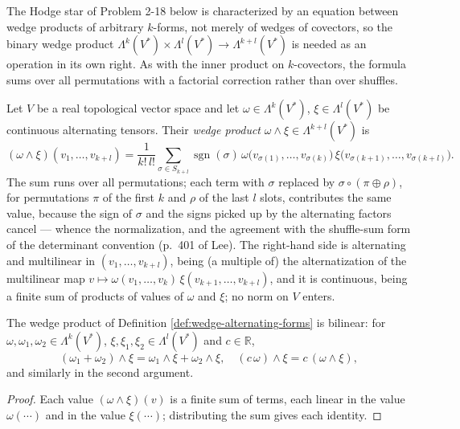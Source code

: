 The Hodge star of Problem 2-18 below is characterized by an equation between wedge products of arbitrary $k$-forms, not merely of wedges of covectors, so the binary wedge product $\Lambda^k(V^*) \times \Lambda^l(V^*) \to \Lambda^{k+l}(V^*)$ is needed as an operation in its own right. As with the inner product on $k$-covectors, the formula sums over all permutations with a factorial correction rather than over shuffles.

\begin{definition}
\label{def:wedge-alternating-forms}
\leanok
Let $V$ be a real topological vector space and let $\omega \in \Lambda^k(V^*)$, $\xi \in \Lambda^l(V^*)$ be continuous alternating tensors. Their \emph{wedge product} $\omega \wedge \xi \in \Lambda^{k+l}(V^*)$ is
\[
(\omega \wedge \xi)(v_1, \ldots, v_{k+l}) = \frac{1}{k!\,l!} \sum_{\sigma \in S_{k+l}} \operatorname{sgn}(\sigma)\, \omega\big(v_{\sigma(1)}, \ldots, v_{\sigma(k)}\big)\, \xi\big(v_{\sigma(k+1)}, \ldots, v_{\sigma(k+l)}\big).
\]
The sum runs over all permutations; each term with $\sigma$ replaced by $\sigma \circ (\pi \oplus \rho)$, for permutations $\pi$ of the first $k$ and $\rho$ of the last $l$ slots, contributes the same value, because the sign of $\sigma$ and the signs picked up by the alternating factors cancel --- whence the normalization, and the agreement with the shuffle-sum form of the determinant convention (p.~401 of Lee). The right-hand side is alternating and multilinear in $(v_1, \ldots, v_{k+l})$, being (a multiple of) the alternatization of the multilinear map $v \mapsto \omega(v_1, \ldots, v_k)\,\xi(v_{k+1}, \ldots, v_{k+l})$, and it is continuous, being a finite sum of products of values of $\omega$ and $\xi$; no norm on $V$ enters.
\end{definition}

\begin{lemma}
\label{lem:wedge-bilinear}
\leanok
{}
The wedge product of Definition \ref{def:wedge-alternating-forms} is bilinear: for $\omega, \omega_1, \omega_2 \in \Lambda^k(V^*)$, $\xi, \xi_1, \xi_2 \in \Lambda^l(V^*)$ and $c \in \mathbb{R}$,
\[
(\omega_1 + \omega_2) \wedge \xi = \omega_1 \wedge \xi + \omega_2 \wedge \xi, \quad (c\,\omega) \wedge \xi = c\,(\omega \wedge \xi),
\]
and similarly in the second argument.
\end{lemma}
\begin{proof}
\leanok
Each value $(\omega \wedge \xi)(v)$ is a finite sum of terms, each linear in the value $\omega(\cdots)$ and in the value $\xi(\cdots)$; distributing the sum gives each identity.
\end{proof}

